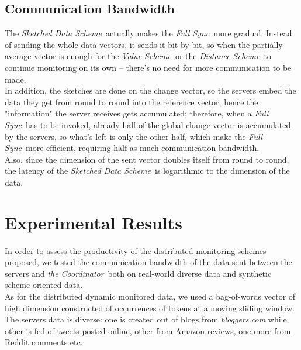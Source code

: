 \documentclass[10pt, conference]{IEEEtran}
\newcommand{\valueScheme}{\textit{Value Scheme}}
\newcommand{\distanceScheme}{\textit{Distance Scheme}}
\newcommand{\sketchScheme}{\textit{Sketched Data Scheme}}
\newcommand{\fullSync}{\textit{Full Sync}}
\newcommand{\theCoordinator}{\textit{the Coordinator}}
\begin{document}
\subsection{Communication Bandwidth}
The \sketchScheme \ actually makes the \fullSync \ more gradual. Instead of sending the whole data vectors, it sends it bit by bit, so when the partially average vector is enough for the \valueScheme \ or the \distanceScheme \ to continue monitoring on its own -- there's no need for more communication to be made. \\
In addition, the sketches are done on the change vector, so the servers embed the data they get from round to round into the reference vector, hence the "information" the server receives gets accumulated; therefore, when a \fullSync \ has to be invoked, already half of the global change vector is accumulated by the servers, so what's left is only the other half, which make the \fullSync \ more efficient, requiring half as much communication bandwidth. \\
Also, since the dimension of the sent vector doubles itself from round to round, the latency of the \sketchScheme \ is logarithmic to the dimension of the data.  

\section{Experimental Results}
In order to assess the productivity of the distributed monitoring schemes proposed, we tested the communication bandwidth of the data sent between the servers and \theCoordinator \ both on real-world diverse data and synthetic scheme-oriented data. \\
As for the distributed dynamic monitored data, we used a bag-of-words vector of high dimension constructed of occurrences of tokens at a moving sliding window. \\
The servers data is diverse: one is created out of blogs from \textit{bloggers.com} while other is fed of tweets posted online, other from Amazon reviews, one more from Reddit comments etc.
\end{document}
